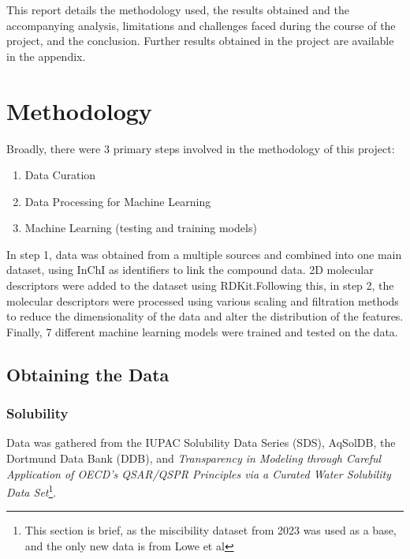 \documentclass[11pt, titlepage]{article}
\begin{document}
This report details the methodology used, the results obtained and the accompanying analysis, limitations and challenges faced during the course of the project, and the conclusion. Further results obtained in the project are available in the appendix.
\section{Methodology}
\label{sec:methodology}
Broadly, there were 3 primary steps involved in the methodology of this project:
\begin{enumerate}
	\item Data Curation
	\item Data Processing for Machine Learning
	\item Machine Learning (testing and training models)
\end{enumerate}

In step 1, data was obtained from a multiple sources and combined into one main dataset, using InChI as identifiers to link the compound data. 2D molecular descriptors were added to the dataset using RDKit\cite{RDKitDesc}.Following this, in step 2, the molecular descriptors were processed using various scaling and filtration methods to reduce the dimensionality of the data and alter the distribution of the features. Finally, 7 different machine learning models were trained and tested on the data.  

\subsection{Obtaining the Data}
\label{subsec:obtainingData}
\subsubsection{Solubility}
\label{subsubsec:Solubility}
Data was gathered from the IUPAC Solubility Data Series (SDS)\cite{IUPAC_SDS}, AqSolDB\cite{AqSolDB}, the Dortmund Data Bank (DDB)\cite{DDB_VLE}, and \textit{Transparency in Modeling through Careful Application of OECD's QSAR/QSPR Principles via a Curated Water Solubility Data Set}\cite{LoweSol}\footnote{This section is brief, as the miscibility dataset from 2023\cite{Miscibility} was used as a base, and the only new data is from Lowe et al\cite{LoweSol}}. 
\end{document}
